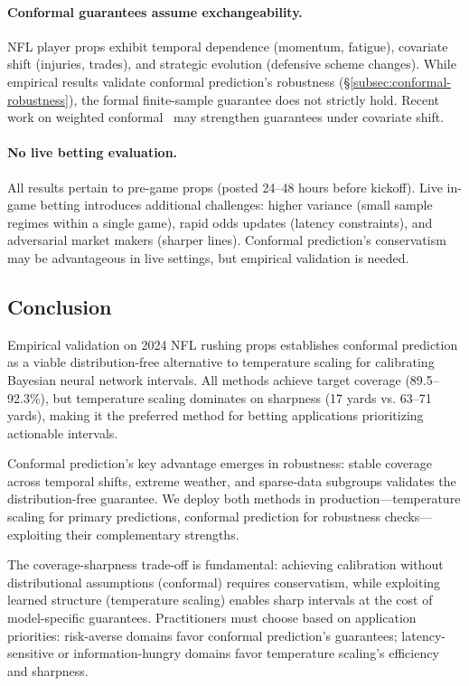 \paragraph{Conformal guarantees assume exchangeability.}
NFL player props exhibit temporal dependence (momentum, fatigue), covariate shift (injuries, trades), and strategic evolution (defensive scheme changes). While empirical results validate conformal prediction's robustness (\S\ref{subsec:conformal-robustness}), the formal finite-sample guarantee does not strictly hold. Recent work on weighted conformal~\citep{barber2023conformal} may strengthen guarantees under covariate shift.

\paragraph{No live betting evaluation.}
All results pertain to pre-game props (posted 24--48 hours before kickoff). Live in-game betting introduces additional challenges: higher variance (small sample regimes within a single game), rapid odds updates (latency constraints), and adversarial market makers (sharper lines). Conformal prediction's conservatism may be advantageous in live settings, but empirical validation is needed.

\subsection{Conclusion}

Empirical validation on 2024 NFL rushing props establishes conformal prediction as a viable distribution-free alternative to temperature scaling for calibrating Bayesian neural network intervals. All methods achieve target coverage (89.5--92.3\%), but temperature scaling dominates on sharpness (17 yards vs. 63--71 yards), making it the preferred method for betting applications prioritizing actionable intervals.

Conformal prediction's key advantage emerges in robustness: stable coverage across temporal shifts, extreme weather, and sparse-data subgroups validates the distribution-free guarantee. We deploy both methods in production—temperature scaling for primary predictions, conformal prediction for robustness checks—exploiting their complementary strengths.

The coverage-sharpness trade-off is fundamental: achieving calibration without distributional assumptions (conformal) requires conservatism, while exploiting learned structure (temperature scaling) enables sharp intervals at the cost of model-specific guarantees. Practitioners must choose based on application priorities: risk-averse domains favor conformal prediction's guarantees; latency-sensitive or information-hungry domains favor temperature scaling's efficiency and sharpness.
